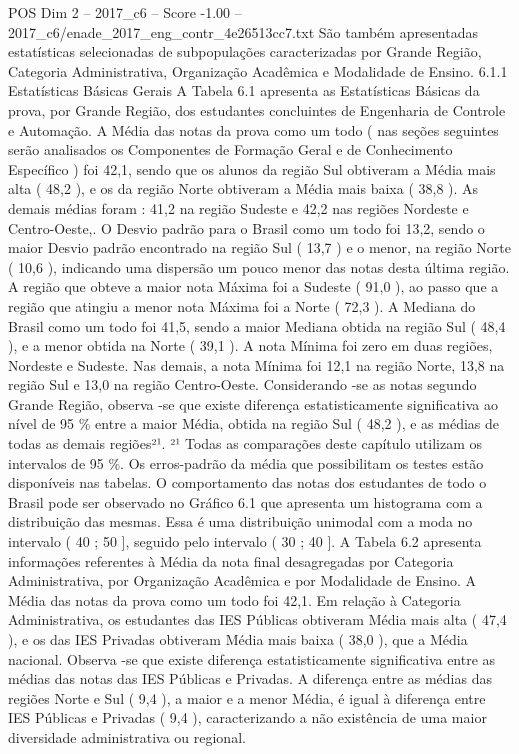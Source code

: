 \begin{textsample}{POS Dim 2 – 2017\_c6 – Score -1.00 – 2017\_c6/enade\_2017\_eng\_contr\_4e26513cc7.txt}
São também apresentadas estatísticas selecionadas de subpopulações caracterizadas por Grande Região, Categoria Administrativa, Organização Acadêmica e Modalidade de Ensino. 6.1.1 Estatísticas Básicas Gerais A Tabela 6.1 apresenta as Estatísticas Básicas da prova, por Grande Região, dos estudantes concluintes de Engenharia de Controle e Automação.
A Média das notas da prova como um todo ( nas seções seguintes serão analisados os Componentes de Formação Geral e de Conhecimento Específico ) foi 42,1, sendo que os alunos da região Sul obtiveram a Média mais alta ( 48,2 ), e os da região Norte obtiveram a Média mais baixa ( 38,8 ).
As demais médias foram : 41,2 na região Sudeste e 42,2 nas regiões Nordeste e Centro-Oeste,.
O Desvio padrão para o Brasil como um todo foi 13,2, sendo o maior Desvio padrão encontrado na região Sul ( 13,7 ) e o menor, na região Norte ( 10,6 ), indicando uma dispersão um pouco menor das notas desta última região.
A região que obteve a maior nota Máxima foi a Sudeste ( 91,0 ), ao passo que a região que atingiu a menor nota Máxima foi a Norte ( 72,3 ).
A Mediana do Brasil como um todo foi 41,5, sendo a maior Mediana obtida na região Sul ( 48,4 ), e a menor obtida na Norte ( 39,1 ).
A nota Mínima foi zero em duas regiões, Nordeste e Sudeste.
Nas demais, a nota Mínima foi 12,1 na região Norte, 13,8 na região Sul e 13,0 na região Centro-Oeste.
Considerando -se as notas segundo Grande Região, observa -se que existe diferença estatisticamente significativa ao nível de 95 \% entre a maior Média, obtida na região Sul ( 48,2 ), e as médias de todas as demais regiões²¹. ²¹ Todas as comparações deste capítulo utilizam os intervalos de 95 \%.
Os erros-padrão da média que possibilitam os testes estão disponíveis nas tabelas.
O comportamento das notas dos estudantes de todo o Brasil pode ser observado no Gráfico 6.1 que apresenta um histograma com a distribuição das mesmas.
Essa é uma distribuição unimodal com a moda no intervalo ( 40 ; 50 ], seguido pelo intervalo ( 30 ; 40 ].
A Tabela 6.2 apresenta informações referentes à Média da nota final desagregadas por Categoria Administrativa, por Organização Acadêmica e por Modalidade de Ensino.
A Média das notas da prova como um todo foi 42,1.
Em relação à Categoria Administrativa, os estudantes das IES Públicas obtiveram Média mais alta ( 47,4 ), e os das IES Privadas obtiveram Média mais baixa ( 38,0 ), que a Média nacional.
Observa -se que existe diferença estatisticamente significativa entre as médias das notas das IES Públicas e Privadas.
A diferença entre as médias das regiões Norte e Sul ( 9,4 ), a maior e a menor Média, é igual à diferença entre IES Públicas e Privadas ( 9,4 ), caracterizando a não existência de uma maior diversidade administrativa ou regional.

\end{textsample}

